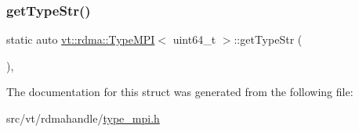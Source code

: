 \mbox{\label{structvt_1_1rdma_1_1_type_m_p_i_3_01uint64__t_01_4_a61515144d0ef554cb83e6e48115bb7c5}} 
\subsubsection{\texorpdfstring{get\+Type\+Str()}{getTypeStr()}}
{\footnotesize\ttfamily static auto \hyperlink{structvt_1_1rdma_1_1_type_m_p_i}{vt\+::rdma\+::\+Type\+M\+PI}$<$ uint64\+\_\+t $>$\+::get\+Type\+Str (\begin{DoxyParamCaption}{ }\end{DoxyParamCaption})\hspace{0.3cm}{\ttfamily [inline]}, {\ttfamily [static]}}



The documentation for this struct was generated from the following file\+:\begin{DoxyCompactItemize}
\item 
src/vt/rdmahandle/\hyperlink{type__mpi_8h}{type\+\_\+mpi.\+h}\end{DoxyCompactItemize}
